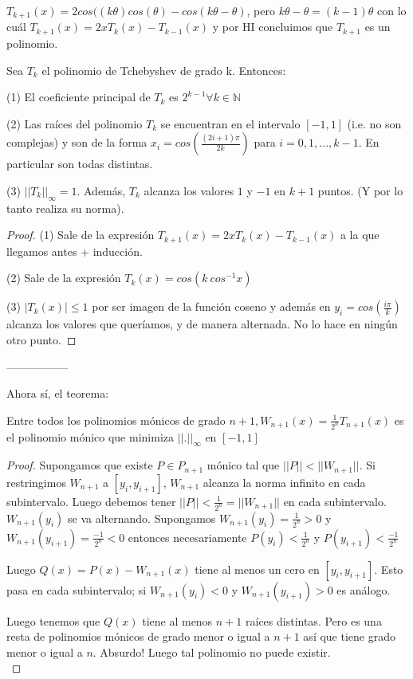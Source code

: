 \documentclass[10pt,a4paper,final]{report}
\begin{document}
$T_{k+1}(x) = 2 cos((k \theta) cos(\theta) - cos(k \theta - \theta) $, pero $k \theta - \theta= (k-1) \theta$ con lo cuál $T_{k+1}(x) = 2x T_k(x) - T_{k-1}(x)$ y por HI concluimos que $T_{k+1}$ es un polinomio.


\begin{proposition}Sea $T_k$ el polinomio de Tchebyshev de grado k. Entonces:

(1) El coeficiente principal de $T_k$ es $2^{k-1} \forall k \in \mathbb{N}$

(2) Las raíces del polinomio $T_k$ se encuentran en el intervalo $[-1,1]$ (i.e. no son complejas) y son de la forma $x_i= cos(\frac{(2i+1)\pi}{2k})$ para $i=0,1,...,k-1$. En particular son todas distintas.

(3) $||T_k||_\infty = 1$. Además, $T_k$ alcanza los valores $1$ y $-1$ en $k+1$ puntos. (Y por lo tanto realiza su norma).

\end{proposition}

\begin{proof}

(1) Sale de la expresión $T_{k+1}(x) = 2x T_k(x) - T_{k-1}(x)$ a la que llegamos antes + inducción.

(2)  Sale de la expresión $T_k(x) = cos(k\ cos^{-1}x)$

(3) $|T_k(x)|\leq 1$ por ser imagen de la función coseno y además en $y_i = cos(\frac{i\pi}{k})$ alcanza los valores que queríamos, y de manera alternada. No lo hace en ningún otro punto.
\end{proof}

-----------------


Ahora sí, el teorema: \\

\begin{theorem}Entre todos los polinomios mónicos de grado $n+1, W_{n+1}(x) = \frac{1}{2^n} T_{n+1}(x)$ es el polinomio mónico que minimiza $||.||_\infty$ en $[-1,1]$
\end{theorem}

\begin{proof}

Supongamos que existe $P\in P_{n+1}$ mónico tal que $||P|| < ||W_{n+1}||$. Si restringimos $W_{n+1}$ a $[y_i,y_{i+1}]$, $W_{n+1}$ alcanza la norma infinito en cada subintervalo. Luego debemos tener $||P|| < \frac{1}{2^n} = ||W_{n+1}||$ en cada subintervalo. $W_{n+1}(y_i)$ se va alternando. Supongamos $W_{n+1}(y_i) = \frac{1}{2^n} > 0$ y $W_{n+1}(y_{i+1}) = \frac{-1}{2^n} < 0$ entonces necesariamente $P(y_i) < \frac{1}{2^n}$ y $P(y_{i+1}) < \frac{-1}{2^n}$

Luego $Q(x)= P(x) - W_{n+1}(x)$ tiene al menos un cero en $[y_i,y_{i+1}]$. Esto pasa en cada subintervalo; si $W_{n+1}(y_i)<0$ y $W_{n+1}(y_{i+1})>0$ es análogo.

Luego tenemos que $Q(x)$ tiene al menos $n+1$ raíces distintas. Pero es una resta de polinomios mónicos de grado menor o igual a $n+1$ así que tiene grado menor o igual a $n$. Absurdo! Luego tal polinomio no puede existir.\\

\end{proof}
\end{document}
